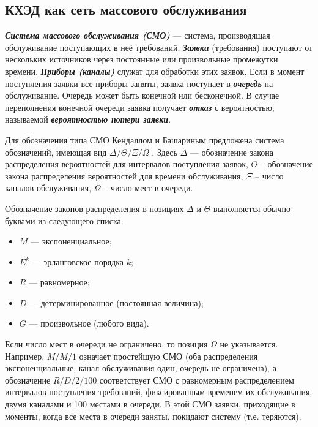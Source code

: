 \subsection{КХЭД как сеть массового обслуживания} \label{net}

\textbf{\textit{Система массового обслуживания (СМО)}} --- система, производящая обслуживание поступающих в неё требований. \textbf{\textit{Заявки}} (требования) поступают от нескольких источников через постоянные или произвольные промежутки времени. \textbf{\textit{Приборы (каналы)}} служат для обработки этих заявок. Если в момент поступления заявки все приборы заняты, заявка поступает в \textbf{\textit{очередь}} на обслуживание. Очередь может быть конечной или бесконечной. В случае переполнения конечной очереди заявка получает \textbf{\textit{отказ}} с вероятностью, называемой \textbf{\textit{вероятностью потери заявки}}.

\vspace{\baselineskip}
Для обозначения типа СМО Кендаллом и Башариным предложена система обозначений, имеющая вид $\Delta / \Theta / \Xi / \Omega$ \cite{basharinq,basharin-models,basharin-sb}. Здесь $\Delta$ --- обозначение закона распределения вероятностей для интервалов поступления заявок, $\Theta$ – обозначение закона распределения вероятностей для времени обслуживания, $\Xi$ – число каналов обслуживания, $\Omega$ – число мест в очереди.

\vspace{\baselineskip}
Обозначение законов распределения в позициях $\Delta$ и $\Theta$ выполняется обычно буквами из следующего списка:

\begin{itemize}
  \item $M$ --- экспоненциальное;
  \item $E^k$ --- эрланговское порядка $k$;
  \item $R$ --- равномерное;
  \item $D$ --- детерминированное (постоянная величина);
  \item $G$ --- произвольное (любого вида).
\end{itemize}

Если число мест в очереди не ограничено, то позиция $\Omega$ не указывается.
Например, $M/M/1$ означает простейшую СМО (оба распределения экспоненциальные, канал обслуживания один, очередь не ограничена), а обозначение $R/D/2/100$ соответствует СМО с равномерным распределением интервалов поступления требований, фиксированным временем их обслуживания, двумя каналами и 100 местами в очереди. В этой СМО заявки, приходящие в моменты, когда все места в очереди заняты, покидают систему (т.е. теряются).

